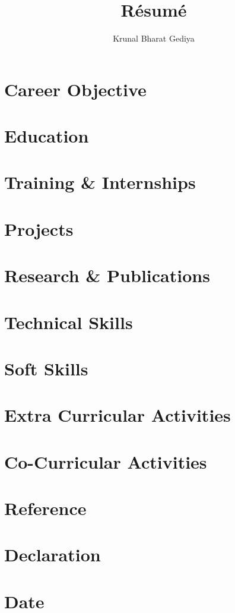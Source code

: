 \documentclass[11pt]{article}
\begin{document}
\title{R\'esum\'e}
\author{Krunal Bharat Gediya}
\maketitle
\section{Career Objective}
\section{Education}
\section{Training \& Internships}
\section{Projects}
\section{Research \& Publications}
\section{Technical Skills}
\section{Soft Skills}
\section{Extra Curricular Activities}
\section{Co-Curricular Activities}
\section{Reference}
\section{Declaration}
\section{Date}
\end{document}

